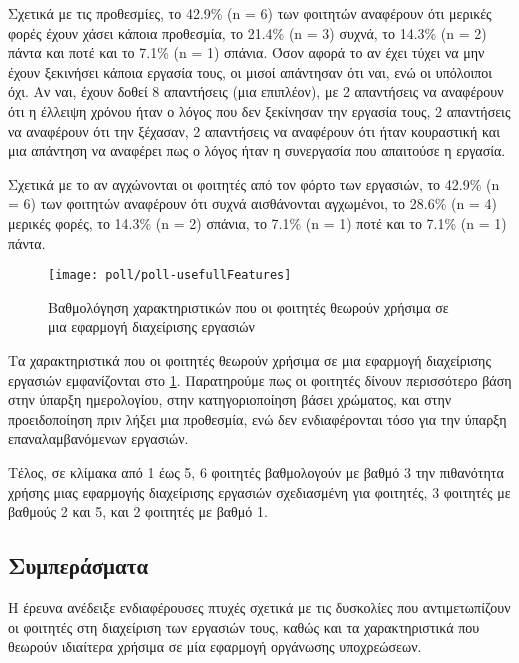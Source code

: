             Σχετικά με τις προθεσμίες, το 42.9\% (n = 6) των φοιτητών αναφέρουν ότι μερικές φορές έχουν χάσει κάποια προθεσμία, το 21.4\% (n = 3) συχνά, το 14.3\% (n = 2) πάντα και ποτέ και το 7.1\% (n = 1) σπάνια. Όσον αφορά το αν έχει τύχει να μην έχουν ξεκινήσει κάποια εργασία τους, οι μισοί απάντησαν ότι ναι, ενώ οι υπόλοιποι όχι. Αν ναι, έχουν δοθεί 8 απαντήσεις (μια επιπλέον), με 2 απαντήσεις να αναφέρουν ότι η έλλειψη χρόνου ήταν ο λόγος που δεν ξεκίνησαν την εργασία τους, 2 απαντήσεις να αναφέρουν ότι την ξέχασαν, 2 απαντήσεις να αναφέρουν ότι ήταν κουραστική και μια απάντηση να αναφέρει πως ο λόγος ήταν η συνεργασία που απαιτούσε η εργασία.

            Σχετικά με το αν αγχώνονται οι φοιτητές από τον φόρτο των εργασιών, το 42.9\% (n = 6) των φοιτητών αναφέρουν ότι συχνά αισθάνονται αγχωμένοι, το 28.6\% (n = 4) μερικές φορές, το 14.3\% (n = 2) σπάνια, το 7.1\% (n = 1) ποτέ και το 7.1\% (n = 1) πάντα.

            \begin{figure}[h!] \noindent \centering
                \texttt{[image: poll/poll-usefullFeatures]}
                \caption{Βαθμολόγηση χαρακτηριστικών που οι φοιτητές θεωρούν χρήσιμα σε μια εφαρμογή διαχείρισης εργασιών}
                \label{fig:poll-usefullFeatures}
            \end{figure}

            Τα χαρακτηριστικά που οι φοιτητές θεωρούν χρήσιμα σε μια εφαρμογή διαχείρισης εργασιών εμφανίζονται στο \ref{fig:poll-usefullFeatures}. Παρατηρούμε πως οι φοιτητές δίνουν περισσότερο βάση στην ύπαρξη ημερολογίου, στην κατηγοριοποίηση βάσει χρώματος, και στην προειδοποίηση πριν λήξει μια προθεσμία, ενώ δεν ενδιαφέρονται τόσο για την ύπαρξη επαναλαμβανόμενων εργασιών.

            Τέλος, σε κλίμακα από 1 έως 5, 6 φοιτητές βαθμολογούν με βαθμό 3 την πιθανότητα χρήσης μιας εφαρμογής διαχείρισης εργασιών σχεδιασμένη για φοιτητές, 3 φοιτητές με βαθμούς 2 και 5, και 2 φοιτητές με βαθμό 1.

        \subsection{Συμπεράσματα}
            Η έρευνα ανέδειξε ενδιαφέρουσες πτυχές σχετικά με τις δυσκολίες που αντιμετωπίζουν οι φοιτητές στη διαχείριση των εργασιών τους, καθώς και τα χαρακτηριστικά που θεωρούν ιδιαίτερα χρήσιμα σε μία εφαρμογή οργάνωσης υποχρεώσεων.

